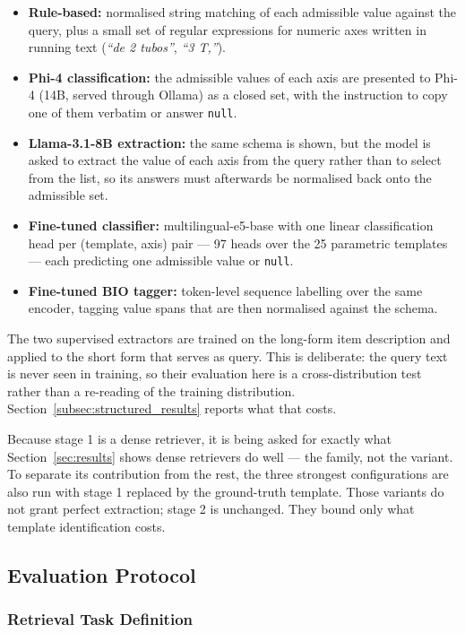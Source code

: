 \documentclass[preprint,12pt]{elsarticle}
\begin{document}
\begin{itemize}
    \item \textbf{Rule-based:} normalised string matching of each admissible value against the query, plus a small set of regular expressions for numeric axes written in running text (\textit{``de 2 tubos''}, \textit{``3 T,''}).
    \item \textbf{Phi-4 classification:} the admissible values of each axis are presented to Phi-4 (14B, served through Ollama) as a closed set, with the instruction to copy one of them verbatim or answer \texttt{null}.
    \item \textbf{Llama-3.1-8B extraction:} the same schema is shown, but the model is asked to extract the value of each axis from the query rather than to select from the list, so its answers must afterwards be normalised back onto the admissible set.
    \item \textbf{Fine-tuned classifier:} multilingual-e5-base with one linear classification head per (template, axis) pair --- 97 heads over the 25 parametric templates --- each predicting one admissible value or \texttt{null}.
    \item \textbf{Fine-tuned BIO tagger:} token-level sequence labelling over the same encoder, tagging value spans that are then normalised against the schema.
\end{itemize}

The two supervised extractors are trained on the long-form item description and applied to the short form that serves as query. This is deliberate: the query text is never seen in training, so their evaluation here is a cross-distribution test rather than a re-reading of the training distribution. Section~\ref{subsec:structured_results} reports what that costs.

Because stage 1 is a dense retriever, it is being asked for exactly what Section~\ref{sec:results} shows dense retrievers do well --- the family, not the variant. To separate its contribution from the rest, the three strongest configurations are also run with stage 1 replaced by the ground-truth template. Those variants do not grant perfect extraction; stage 2 is unchanged. They bound only what template identification costs.

\subsection{Evaluation Protocol}

\subsubsection{Retrieval Task Definition}
\end{document}
